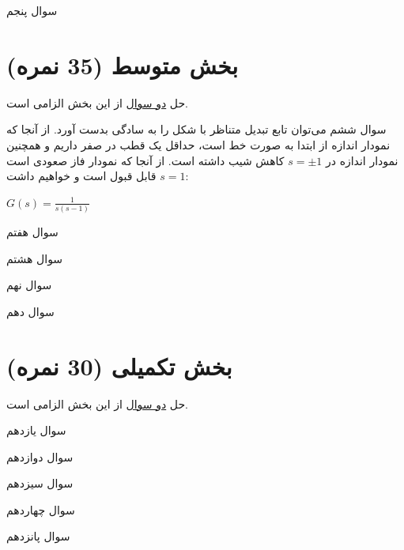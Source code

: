 \documentclass{article}
\begin{document}
    
    \begin{problem}{سوال پنجم}
    
    \end{problem}
\raggedleft    
\section{بخش متوسط (35 نمره)}
\centering
حل \underline{دو سوال} از این بخش الزامی است.
\begin{problem}{سوال ششم}
	می‌توان تابع تبدیل متناظر با شکل را به سادگی بدست آورد. از آنجا که نمودار اندازه از ابتدا به صورت خط است، حداقل یک قطب در صفر داریم و همچنین نمودار اندازه در 
	$s = \pm 1$
	کاهش شیب داشته است. از آنجا که نمودار فاز صعودی است
	$s = 1$
	قابل قبول است و خواهیم داشت:
	
	\raggedleft
	$G(s) = \frac{1}{s(s-1)}$
	
	


\end{problem}
	

\begin{problem}{سوال هفتم}
	
\end{problem}


\begin{problem}{سوال هشتم}
	

\end{problem}


\begin{problem}{سوال نهم}
	
\end{problem}


\begin{problem}{سوال دهم}
	
	
\end{problem}


\raggedleft
\section{ بخش تکمیلی (30 نمره)}
\centering
حل \underline{دو سوال} از این بخش الزامی است.
\begin{problem}{سوال یازدهم}
	
\end{problem}



\begin{problem}{سوال دوازدهم}
	
\end{problem}



\begin{problem}{سوال سیزدهم}
	
	
	
\end{problem}


\begin{problem}{سوال چهاردهم}

	
\end{problem}


\begin{problem}{سوال پانزدهم}
	
\end{problem}
\end{document}
